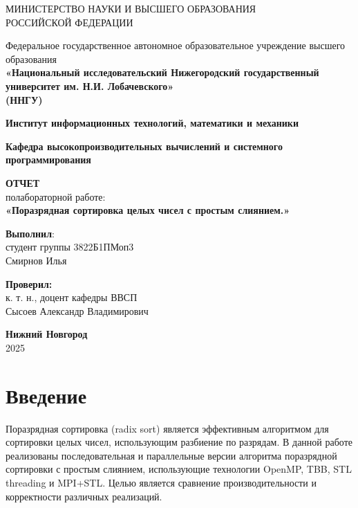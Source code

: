 \documentclass[a4paper,12pt]{article}
\begin{document}
\begin{titlepage}
\centering
{МИНИСТЕРСТВО НАУКИ И ВЫСШЕГО ОБРАЗОВАНИЯ\\
РОССИЙСКОЙ ФЕДЕРАЦИИ}

\vspace{1em}

Федеральное государственное автономное образовательное учреждение высшего образования\\
\textbf{«Национальный исследовательский Нижегородский государственный университет им. Н.И. Лобачевского»}\\
\textbf{(ННГУ)}

\vspace{2em}

\textbf{Институт информационных технологий, математики и механики}

\vspace{1em}

\textbf{Кафедра высокопроизводительных вычислений и системного программирования}


\textbf{\Large ОТЧЕТ}\\
полабораторной работе:\\


\vspace{2em}
\textbf{«Поразрядная сортировка целых чисел с простым
слиянием.»}
\vspace{4em}
\begin{flushright}
\textbf{Выполнил}:\\[5pt]
студент группы {3822Б1ПМоп3} \\[1em]
{Смирнов Илья}
\end{flushright}

\vspace{1em}

\begin{flushright}

\noindent\textbf{Проверил:} \\[5pt]
к. т. н., доцент кафедры ВВСП \\[5pt]
{Сысоев Александр Владимирович}
\end{flushright}

\vspace{1em}

\vfill
\textbf{Нижний Новгород}\\
2025
\end{titlepage}

\tableofcontents
\newpage

\section{Введение}
Поразрядная сортировка (radix sort) является эффективным алгоритмом для сортировки целых чисел, использующим разбиение по разрядам. В данной работе реализованы последовательная и параллельные версии алгоритма поразрядной сортировки с простым слиянием, использующие технологии OpenMP, TBB, STL threading и MPI+STL. Целью является сравнение производительности и корректности различных реализаций.
\end{document}
